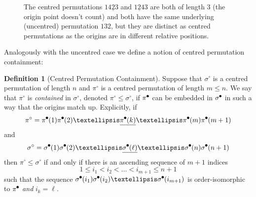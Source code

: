 \documentclass[11pt,a4paper]{article}
\newcommand{\plotptradius}{4pt}
\theoremstyle{definition}
\newtheorem{defn}[thm]{Definition}
\newcommand{\tikzcircle}[2][black,fill=black]{\tikz[baseline=-0.5ex]\draw[#1,radius=#2] (0,0) circle ;}
\begin{document}
\begin{figure}[h]
\begin{center}
\end{center}
\caption{The centred permutations $14\underline{2}3$ and $1\underline{2}43$ are both of length $3$ (the origin point doesn't count) and both have the same underlying (uncentred) permutation $132$, but they are distinct as centred permutations as the origins are in different relative positions.}
\label{fig:centred2}
\end{figure}
Analogously with the uncentred case we define a notion of centred permutation containment:
\begin{defn}[Centred Permutation Containment]
Suppose that $\sigma^{\circ}$ is a centred permutation of length $n$ and $\pi^{\circ}$ is a centred permutation of length $m \leq n$. We say that $\pi^{\circ}$ is \emph{contained} in $\sigma^{\circ}$, denoted $\pi^{\circ} \leq \sigma^{\circ}$, if $\pi^{\tikzcircle{1.5pt}}$ can be embedded in $\sigma^{\tikzcircle{1.5pt}}$ in such a way that the origins match up. Explicitly, if
\[
\pi^{\circ} = \pi^{\tikzcircle{1.5pt}}(1)\pi^{\tikzcircle{1.5pt}}(2)\dots\underline{\pi^{\tikzcircle{1.5pt}}(k)}\dots\pi^{\tikzcircle{1.5pt}}(m)\pi^{\tikzcircle{1.5pt}}(m+1)
\]
and
\[
\sigma^{\circ} = \sigma^{\tikzcircle{1.5pt}}(1)\sigma^{\tikzcircle{1.5pt}}(2)\dots\underline{\sigma^{\tikzcircle{1.5pt}}(\ell)}\dots\sigma^{\tikzcircle{1.5pt}}(n)\sigma^{\tikzcircle{1.5pt}}(n+1)
\]
then $\pi^{\circ} \leq \sigma^{\circ}$ if and only if there is an ascending sequence of $m+1$ indices
\begin{equation*}
1 \leq i_{1} < i_{2} < \dots < i_{m+1} \leq n + 1
\end{equation*}
such that the sequence $\sigma^{\tikzcircle{1.5pt}}(i_{1})\sigma^{\tikzcircle{1.5pt}}(i_{2})\dots\sigma^{\tikzcircle{1.5pt}}(i_{m+1})$ is order-isomorphic to $\pi^{\tikzcircle{1.5pt}}$ \emph{and} $i_{k} = \ell$.
\end{defn}
\end{document}
